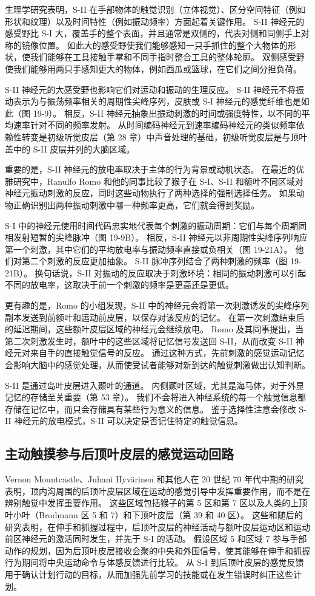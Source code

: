 生理学研究表明，S-II 在手部物体的触觉识别（立体视觉）、区分空间特征（例如形状和纹理）以及时间特性（例如振动频率）方面起着关键作用。 S-II 神经元的感受野比 S-I 大，覆盖手的整个表面，并且通常是双侧的，代表对侧和同侧手上对称的镜像位置。 如此大的感受野使我们能够感知一只手抓住的整个大物体的形状，使我们能够在工具接触手掌和不同手指时整合工具的整体轮廓。 双侧感受野使我们能够用两只手感知更大的物体，例如西瓜或篮球，在它们之间分担负荷。

S-II 神经元的大感受野也影响它们对运动和振动的生理反应。 S-II 神经元不将振动表示为与振荡频率相关的周期性尖峰序列，皮肤或 S-I 神经元的感觉纤维也是如此（图 19-9）。 相反，S-II 神经元抽象出振动刺激的时间或强度特性，以不同的平均速率针对不同的频率发射。 从时间编码神经元到速率编码神经元的类似频率依赖性转变是初级听觉皮层（第 28 章）中声音处理的基础，初级听觉皮层是与顶叶盖中的 S-II 皮层并列的大脑区域。

重要的是，S-II 神经元的放电率取决于主体的行为背景或动机状态。 在最近的优雅研究中，Ranulfo Romo 和他的同事比较了猴子在 S-I、S-II 和额叶不同区域对神经元振动刺激的反应，同时这些动物执行了两种选择的强制选择任务。 如果动物正确识别出两种振动刺激中哪一种频率更高，它们就会得到奖励。

S-I 中的神经元使用时间代码忠实地代表每个刺激的振动周期：它们与每个周期同相发射短暂的尖峰脉冲（图 19-9B）。 相反，S-II 神经元以非周期性尖峰序列响应第一个刺激，其中它们的平均放电率与振动频率直接或负相关（图 19-21A）。 他们对第二个刺激的反应更加抽象。 S-II 脉冲序列结合了两种刺激的频率（图 19-21B）。 换句话说，S-II 对振动的反应取决于刺激环境：相同的振动刺激可以引起不同的放电率，这取决于前一个刺激的频率是更高还是更低。

更有趣的是，Romo 的小组发现，S-II 中的神经元会将第一次刺激诱发的尖峰序列副本发送到前额叶和运动前皮层，以保存对该反应的记忆。 在第一次刺激结束后的延迟期间，这些额叶皮层区域的神经元会继续放电。 Romo 及其同事提出，当第二次刺激发生时，额叶中的这些区域将记忆信号发送回 S-II，从而改变 S-II 神经元对来自手的直接触觉信号的反应。 通过这种方式，先前刺激的感觉运动记忆会影响大脑中的感觉处理，从而使受试者能够对新到达的触觉刺激做出认知判断。

S-II 是通过岛叶皮层进入颞叶的通道。 内侧颞叶区域，尤其是海马体，对于外显记忆的存储至关重要（第 53 章）。 我们不会将进入神经系统的每一个触觉信息都存储在记忆中，而只会存储具有某些行为意义的信息。 鉴于选择性注意会修改 S-II 神经元的放电模式，S-II 可以决定是否记住特定的触觉信息。

\subsection{主动触摸参与后顶叶皮层的感觉运动回路}
Vernon Mountcastle、Juhani Hyvärinen 和其他人在 20 世纪 70 年代中期的研究表明，顶内沟周围的后顶叶皮层区域在运动的感觉引导中发挥重要作用，而不是在辨别触觉中发挥重要作用。 这些区域包括猴子的第 5 区和第 7 区以及人类的上顶叶小叶（Brodmann 区 5 和 7）和下顶叶皮层（第 39 和 40 区）。 这些和随后的研究表明，在伸手和抓握过程中，后顶叶皮层的神经活动与额叶皮层运动区和运动前区神经元的激活同时发生，并先于 S-I 的活动。 假设区域 5 和区域 7 参与手部动作的规划，因为后顶叶皮层接收会聚的中央和外围信号，使其能够在伸手和抓握行为期间将中央运动命令与体感反馈进行比较。 从 S-I 到后顶叶皮层的感觉反馈用于确认计划行动的目标，从而加强先前学习的技能或在发生错误时纠正这些计划。

